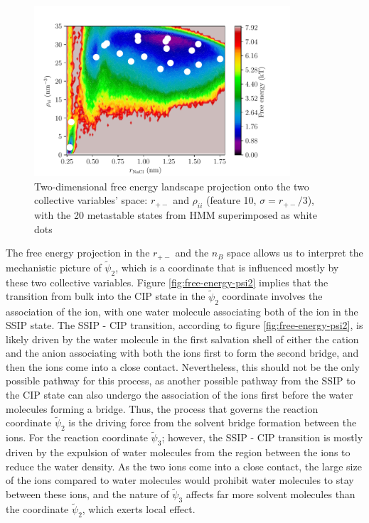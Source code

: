 \begin{spacing}{2.0}
    \begin{figure}[H]
        \centering
        \includegraphics[width=0.85\textwidth]{./figs/fig3-08}
        \caption{Two-dimensional free energy landscape projection onto the two collective variables’ space: $r_{+-}$ and $\rho_{ii}$ (feature 10, 
                 $\sigma = r_{+-}/3$), with the 20 metastable states from HMM superimposed as white dots}
        \label{fig:free-energy-psi3}
    \end{figure}

    The free energy projection in the $r_{+-}$ and the $n_B$ space allows us to interpret the mechanistic picture of $\tilde{\psi}_2$, which is a 
    coordinate that is influenced mostly by these two collective variables. Figure \ref{fig:free-energy-psi2} implies that the transition from bulk 
    into the CIP state in the $\tilde{\psi}_2$ coordinate involves the association of the ion, with one water molecule associating both of the ion 
    in the SSIP state. The SSIP - CIP transition, according to figure \ref{fig:free-energy-psi2}, is likely driven by the water molecule in the 
    first salvation shell of either the cation and the anion associating with both the ions first to form the second bridge, and then the ions come 
    into a close contact. Nevertheless, this should not be the only possible pathway for this process, as another possible pathway from the SSIP to 
    the CIP state can also undergo the association of the ions first before the water molecules forming a bridge. Thus, the process that governs 
    the reaction coordinate $\tilde{\psi}_2$ is the driving force from the solvent bridge formation between the ions. For the reaction coordinate 
    $\tilde{\psi}_3$; however, the SSIP - CIP transition is mostly driven by the expulsion of water molecules from the region between the ions to 
    reduce the water density. As the two ions come into a close contact, the large size of the ions compared to water molecules would prohibit water 
    molecules to stay between these ions, and the nature of $\tilde{\psi}_3$ affects far more solvent molecules than the coordinate $\tilde{\psi}_2$, 
    which exerts local effect.
\end{spacing}
